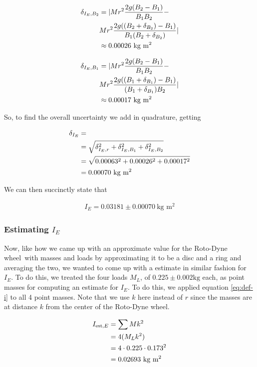 \documentclass[coverpage]{article}
\newcommand{\iUnit}{\text{kg $\text{m}^2$}}
\newcommand{\rwheel}{Roto-Dyne wheel}
\begin{document}
	\begin{align}
		\delta_{I_E, B_2} &= |M r^2 \frac{2g(B_2 - B_1)}{B_1 B_2} - \notag \\
		&M r^2 \frac{2g((B_2 + \delta_{B_2}) - B_1)}{B_1 (B_2 + \delta_{B_2})}| \notag \\
		&\approx 0.00026\ \iUnit
	\end{align}

	\begin{align}
		\delta_{I_E, B_1} &= |M r^2 \frac{2g(B_2 - B_1)}{B_1 B_2} - \notag \\
		&M r^2 \frac{2g((B_1 + \delta_{B_1}) - B_1)}{(B_1 + \delta_{B_1}) B_2}| \notag \\
		&\approx 0.00017\ \iUnit
	\end{align}

	So, to find the overall uncertainty we add in quadrature, getting
	
	\begin{align}
		\delta_{I_E} &= \\
		&= \sqrt{\delta_{I_E, r}^2 + \delta_{I_E, B_1}^2 + \delta_{I_E, B_2}^2} \notag \\
		&= \sqrt{0.00063^2 + 0.00026^2 + 0.00017^2} \notag \\
		&= 0.00070\ \iUnit
	\end{align}

	We can then succinctly state that
	
	\begin{align}
		I_E = 0.03181 \pm 0.00070\ \iUnit \label{eq:def-ie}
	\end{align}

	\subsubsection{Estimating $I_E$}
	
	Now, like how we came up with an approximate value for the \rwheel~with masses and loads by approximating it to be a disc and a ring and averaging the two, we wanted to come up with a estimate in similar fashion for $I_E$. To do this, we treated the four loads $M_L$, of $0.225 \pm 0.002 \text{kg}$ each, as point masses for computing an estimate for $I_E$. To do this, we applied equation \ref{eq:def-i} to all 4 point masses. Note that we use $k$ here instead of $r$ since the masses are at distance $k$ from the center of the \rwheel.
	
	\begin{align}
		I_{\text{est}, E} &= \sum{M k^2} \notag \\
		&= 4 (M_L k^2) \notag \\
		&= 4 \cdot 0.225 \cdot 0.173^2 \notag \\
		&= 0.02693\ \iUnit
	\end{align}
	
\end{document}
